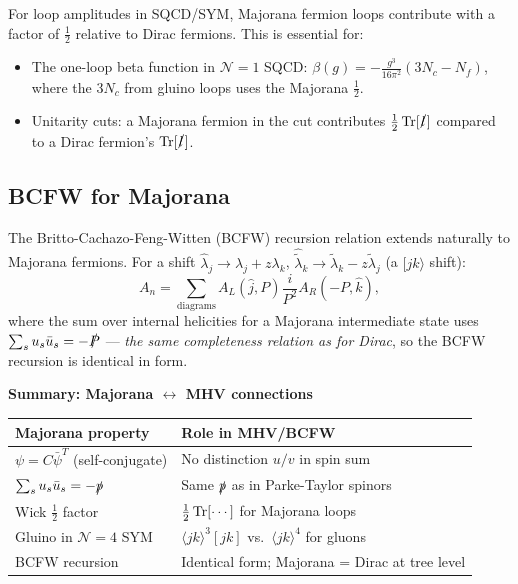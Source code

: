For loop amplitudes in SQCD/SYM, Majorana fermion loops contribute with a factor of
$\tfrac{1}{2}$ relative to Dirac fermions.  This is essential for:
\begin{itemize}
  \item The one-loop beta function in $\mathcal{N}=1$ SQCD:
        $\beta(g) = -\frac{g^3}{16\pi^2}(3N_c - N_f)$, where the $3N_c$ from gluino
        loops uses the Majorana $\tfrac{1}{2}$.
  \item Unitarity cuts: a Majorana fermion in the cut contributes $\tfrac{1}{2}\operatorname{Tr}[\slashed{l}]$
        compared to a Dirac fermion's $\operatorname{Tr}[\slashed{l}]$.
\end{itemize}

\subsection{BCFW for Majorana}

The Britto-Cachazo-Feng-Witten (BCFW) recursion relation extends naturally to Majorana
fermions.  For a shift $\hat\lambda_j \to \lambda_j + z\lambda_k$,
$\hat{\tilde\lambda}_k \to \tilde\lambda_k - z\tilde\lambda_j$ (a $[jk\rangle$ shift):
\begin{equation}
  A_n = \sum_{\text{diagrams}} A_L(\hat j, P) \frac{i}{P^2} A_R(-P, \hat k),
\end{equation}
where the sum over internal helicities for a Majorana intermediate state
uses $\sum_s u_s\bar u_s = -\slashed{P}$ — \emph{the same completeness relation
as for Dirac}, so the BCFW recursion is identical in form.

\begin{mdframed}[backgroundcolor=blue!5]
\textbf{Summary: Majorana $\leftrightarrow$ MHV connections}
\begin{center}
\begin{tabular}{ll}
\toprule
Majorana property & Role in MHV/BCFW \\
\midrule
$\psi = C\bar\psi^T$ (self-conjugate) & No distinction $u/v$ in spin sum \\
$\sum_s u_s\bar u_s = -\slashed{p}$ & Same $\slashed{p}$ as in Parke-Taylor spinors \\
Wick $\tfrac{1}{2}$ factor & $\tfrac{1}{2}\operatorname{Tr}[\cdots]$ for Majorana loops \\
Gluino in $\mathcal{N}=4$ SYM & $\langle jk\rangle^3[jk]$ vs.\ $\langle jk\rangle^4$ for gluons \\
BCFW recursion & Identical form; Majorana = Dirac at tree level \\
\bottomrule
\end{tabular}
\end{center}
\end{mdframed}

\vfill
